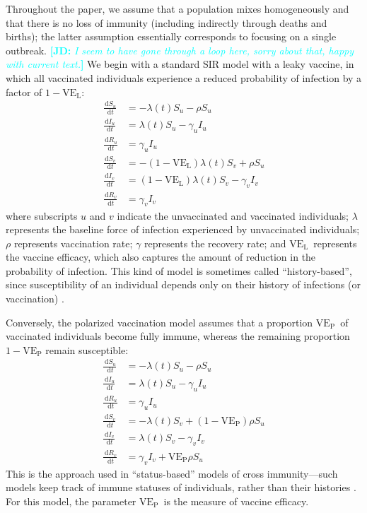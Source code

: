 \documentclass[12pt]{article}
\newcommand{\comment}{\showcomment}
\newcommand{\showcomment}[3]{\textcolor{#1}{\textbf{[#2: }\textsl{#3}\textbf{]}}}
\newcommand{\jd}[1]{\comment{cyan}{JD}{#1}}
\newcommand{\dd}[1]{\ensuremath{\, \mathrm{d}#1}}
\newcommand{\VE}{\ensuremath{\mathrm{VE}}}
\newcommand{\VEP}{\ensuremath{\VE_{\mathrm{P}}}}
\newcommand{\VEL}{\ensuremath{\VE_{\mathrm{L}}}}
\begin{document}
Throughout the paper, we assume that a population mixes homogeneously and that there is no loss of immunity (including indirectly through deaths and births); 
the latter assumption essentially corresponds to focusing on a single outbreak.
\jd{I seem to have gone through a loop here, sorry about that, happy with current text.}
We begin with a standard SIR model with a leaky vaccine, in which all vaccinated individuals experience a reduced probability of infection by a factor of $1-\VEL$:
\begin{align}
\frac{\dd S_u}{\dd t} &= - \lambda(t) S_u - \rho S_u \\
\frac{\dd I_u}{\dd t} &= \lambda(t) S_u - \gamma_u I_u \\
\frac{\dd R_u}{\dd t} &= \gamma_u I_u \\
\frac{\dd S_v}{\dd t} &= - (1-\VEL) \lambda(t) S_v + \rho S_u \\
\frac{\dd I_v}{\dd t} &= (1-\VEL) \lambda(t) S_v - \gamma_v I_v \\
\frac{\dd R_v}{\dd t} &= \gamma_v I_v
\end{align}
where subscripts $u$ and $v$ indicate the unvaccinated and vaccinated individuals;
$\lambda$ represents the baseline force of infection experienced by unvaccinated individuals; 
$\rho$ represents vaccination rate;
$\gamma$ represents the recovery rate;
and \VEL\ represents the vaccine efficacy, which also captures the amount of reduction in the probability of infection.
This kind of model is sometimes called “history-based”, since susceptibility of an individual depends only on their history of infections (or vaccination) \citep{gog2002dynamics,gog2002status,kucharski2016capturing}.

Conversely, the polarized vaccination model assumes that a proportion \VEP\ of vaccinated individuals become fully immune, whereas the remaining proportion $1-\VEP$ remain susceptible: 
\begin{align}
\frac{\dd S_u}{\dd t} &= - \lambda(t) S_u - \rho S_u \\
\frac{\dd I_u}{\dd t} &= \lambda(t) S_u - \gamma_u I_u \\
\frac{\dd R_u}{\dd t} &= \gamma_u I_u \\
\frac{\dd S_v}{\dd t} &= - \lambda(t) S_v + (1-\VEP) \rho S_u \\
\frac{\dd I_v}{\dd t} &= \lambda(t) S_v - \gamma_v I_v \\
\frac{\dd R_v}{\dd t} &= \gamma_v I_v + \VEP \rho S_u
\end{align}
This is the approach used in “status-based” models of cross immunity---such models keep track of immune statuses of individuals, rather than their histories \citep{gog2002dynamics,gog2002status,kucharski2016capturing}.
For this model, the parameter \VEP\ is the measure of vaccine efficacy.
\end{document}

